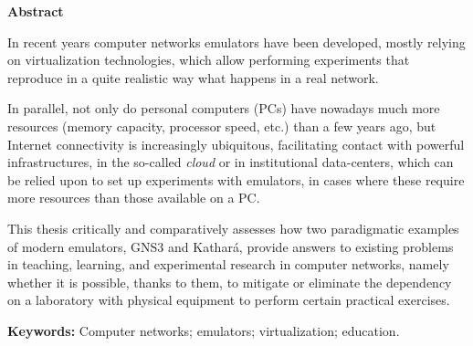 
\cleardoublepage\thispagestyle{plain}

\textbf{\Large Abstract}

In recent years computer networks emulators have been developed, mostly relying on virtualization technologies, which allow performing experiments that reproduce in a quite realistic way what happens in a real network.

In parallel, not only do personal computers (PCs) have nowadays much more resources (memory capacity, processor speed, etc.) than a few years ago, but Internet connectivity is increasingly ubiquitous, facilitating contact with powerful infrastructures, in the so-called \emph{cloud} or in institutional data-centers, which can be relied upon to set up experiments with emulators, in cases where these require more resources than those available on a PC.

This thesis critically and comparatively assesses how two paradigmatic examples of modern emulators, GNS3 and Kathará, provide answers to existing problems in teaching, learning, and experimental research in computer networks, namely whether it is possible, thanks to them, to mitigate or eliminate the dependency on a laboratory with physical equipment to perform certain practical exercises.

\textbf{Keywords:} Computer networks; emulators; virtualization; education.
